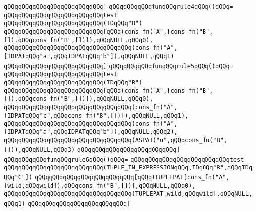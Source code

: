 \verb|qQQqqQQqqQQqqQQqqQQqqQQqqQQq]|\newline
\newline
\verb|qQQqqQQqqQQqfunqQQqrule4qQQq()qQQq=|\newline
\verb|qQQqqQQqqQQqqQQqqQQqqQQqqQQqtest|\newline
\verb|qQQqqQQqqQQqqQQqqQQqqQQqqQQq(IDqQQq"B")|\newline
\verb|qQQqqQQqqQQqqQQqqQQqqQQqqQQq[qQQq(cons_fn("A",[cons_fn("B",[]),qQQqcons_fn("B",[])]),qQQqNULL,qQQq0),|\newline
\verb|qQQqqQQqqQQqqQQqqQQqqQQqqQQqqQQqqQQq(cons_fn("A",[IDPATqQQq"a",qQQqIDPATqQQq"b"]),qQQqNULL,qQQq1)|\newline
\verb|qQQqqQQqqQQqqQQqqQQqqQQqqQQq]|\newline
\newline
\verb|qQQqqQQqqQQqfunqQQqrule5qQQq()qQQq=|\newline
\verb|qQQqqQQqqQQqqQQqqQQqqQQqqQQqtest|\newline
\verb|qQQqqQQqqQQqqQQqqQQqqQQqqQQq(IDqQQq"B")|\newline
\verb|qQQqqQQqqQQqqQQqqQQqqQQqqQQq[qQQq(cons_fn("A",[cons_fn("B",[]),qQQqcons_fn("B",[])]),qQQqNULL,qQQq0),|\newline
\verb|qQQqqQQqqQQqqQQqqQQqqQQqqQQqqQQqqQQq(cons_fn("A",[IDPATqQQq"c",qQQqcons_fn("B",[])]),qQQqNULL,qQQq1),|\newline
\verb|qQQqqQQqqQQqqQQqqQQqqQQqqQQqqQQqqQQq(cons_fn("A",[IDPATqQQq"a",qQQqIDPATqQQq"b"]),qQQqNULL,qQQq2),|\newline
\verb|qQQqqQQqqQQqqQQqqQQqqQQqqQQqqQQqqQQq(ASPAT("u",qQQqcons_fn("B",[])),qQQqNULL,qQQq3)|\newline
\verb|qQQqqQQqqQQqqQQqqQQqqQQqqQQq]|\newline
\newline
\verb|qQQqqQQqqQQqfunqQQqrule6qQQq()qQQq=|\newline
\verb|qQQqqQQqqQQqqQQqqQQqqQQqqQQqtest|\newline
\verb|qQQqqQQqqQQqqQQqqQQqqQQqqQQq(TUPLE_IN_EXPRESSIONqQQq[IDqQQq"B",qQQqIDqQQq"C"])|\newline
\verb|qQQqqQQqqQQqqQQqqQQqqQQqqQQq[qQQq(TUPLEPAT[cons_fn("A",[wild,qQQqwild]),qQQqcons_fn("B",[])],qQQqNULL,qQQq0),|\newline
\verb|qQQqqQQqqQQqqQQqqQQqqQQqqQQqqQQqqQQq(TUPLEPAT[wild,qQQqwild],qQQqNULL,qQQq1)|\newline
\verb|qQQqqQQqqQQqqQQqqQQqqQQqqQQq]|\newline
\newline
